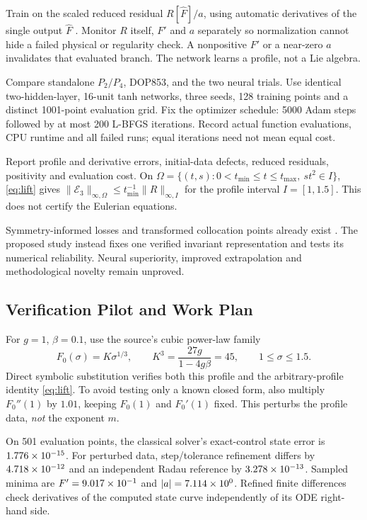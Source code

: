 \documentclass[12pt,a4paper]{article}
\begin{document}
Train on the scaled reduced residual $R[\widehat F]/a$, using automatic derivatives of the single output $\widehat F$ \cite{pinn}. Monitor $R$ itself, $F'$ and $a$ separately so normalization cannot hide a failed physical or regularity check. A nonpositive $F'$ or a near-zero $a$ invalidates that evaluated branch. The network learns a profile, not a Lie algebra.

Compare standalone $P_2/P_4$, DOP853, and the two neural trials. Use identical two-hidden-layer, 16-unit tanh networks, three seeds, 128 training points and a distinct 1001-point evaluation grid. Fix the optimizer schedule: 5000 Adam steps followed by at most 200 L-BFGS iterations. Record actual function evaluations, CPU runtime and all failed runs; equal iterations need not mean equal cost.

Report profile and derivative errors, initial-data defects, reduced residuals, positivity and evaluation cost. On $\Omega=\{(t,s):0<t_{\min}\le t\le t_{\max},\ st^2\in I\}$, \eqref{eq:lift} gives $\|\mathcal E_3\|_{\infty,\Omega}\le t_{\min}^{-1}\|R\|_{\infty,I}$ for the profile interval $I=[1,1.5]$. This does not certify the Eulerian equations.

Symmetry-informed losses and transformed collocation points already exist \cite{liepinn,shah}. The proposed study instead fixes one verified invariant representation and tests its numerical reliability. Neural superiority, improved extrapolation and methodological novelty remain unproved.

\newpage
\subsection{Verification Pilot and Work Plan}
For $g=1$, $\beta=0.1$, use the source's cubic power-law family
\[
F_0(\sigma)=K\sigma^{1/3},\qquad
K^3=\frac{27g}{1-4g\beta}=45,\qquad 1\le\sigma\le1.5.
\]
Direct symbolic substitution verifies both this profile and the arbitrary-profile identity \eqref{eq:lift}. To avoid testing only a known closed form, also multiply $F_0''(1)$ by $1.01$, keeping $F_0(1)$ and $F_0'(1)$ fixed. This perturbs the profile data, \emph{not} the exponent $m$.

On 501 evaluation points, the classical solver's exact-control state error is $1.776\times10^{-15}$. For perturbed data, step/tolerance refinement differs by $4.718\times10^{-12}$ and an independent Radau reference by $3.278\times10^{-13}$. Sampled minima are $F'=9.017\times10^{-1}$ and $|a|=7.114\times10^{0}$. Refined finite differences check derivatives of the computed state curve independently of its ODE right-hand side.
\end{document}
